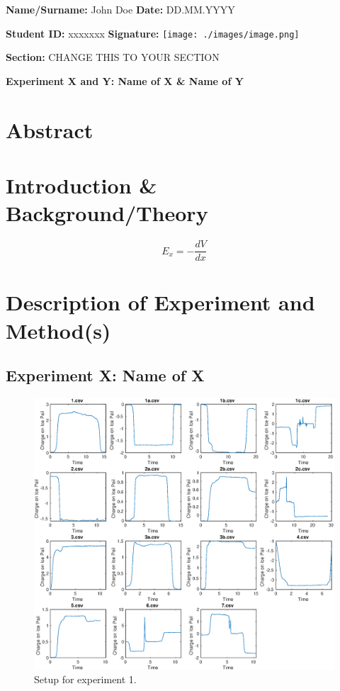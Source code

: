 \documentclass[11pt]{article}
\begin{document}
\textbf{Name/Surname:} John Doe \hfill \textbf{Date:} DD.MM.YYYY %

\textbf{Student ID:} xxxxxxx \hfill \textbf{Signature:}
    \texttt{[image: ./images/image.png]} %


\textbf{Section:} CHANGE THIS TO YOUR SECTION

\begin{center}
  \textbf{Experiment X and Y: Name of X \& Name of Y}
\end{center}

\section{Abstract}


\section{Introduction \& Background/Theory}

\begin{equation}
    E_x=-\frac{dV}{dx}
    \label{eq:eqtoef}
\end{equation}

\section{Description of Experiment and Method(s)}
\subsection{Experiment X: Name of X}

\begin{multicols}{2}

  \lipsum[1]

  \columnbreak
\begin{figure}[H]
    \centering
    \includegraphics[width=0.5\linewidth]{./images/figure1.eps}
    \caption{Setup for experiment 1.}
    \label{fig:setupexp1}
\end{figure}
\end{multicols}
\end{document}
